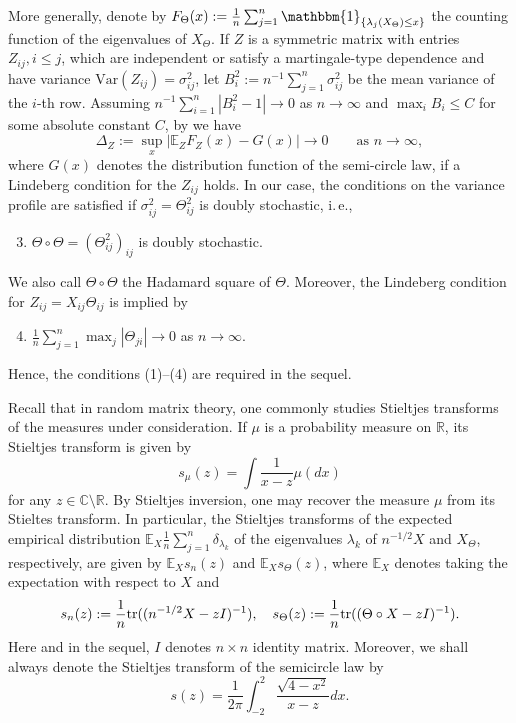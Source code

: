\documentclass[a4paper,12pt]{amsart}
\numberwithin{equation}{section}
\theoremstyle{remark}
\def\E{{\mathbb E}}
\def\C{{\mathbb C}}
\def\R{{\mathbb R}}
\def\tr{{\rm tr}}
\begin{document}
More generally, denote by $F_\Theta (x):= \frac 1 n \sum_{j=1}^n \mathbbm{1}_{\{\lambda_j(X_\Theta) \le x\}}$ the counting function of the eigenvalues of $X_\Theta$. If $Z$ is a symmetric matrix with entries $Z_{ij}, i\le j$, which are independent or satisfy a martingale-type dependence and have variance $\mathrm{Var}(Z_{ij}) = \sigma_{ij}^2$, let $B_i^2 := n^{-1} \sum_{j=1}^n \sigma_{ij}^2$ be the mean variance of the $i$-th row. Assuming $n^{-1} \sum_{i=1}^n |B_i^2-1| \to 0$ as $n \to \infty$ and $\max_i B_i \le C$ for some absolute constant $C$, by \cite[Th.\ 1 \& Cor.\ 1]{GNT15} we have 
\[ \Delta_Z:=\sup_x| \E_ZF_Z(x) - G(x)| \to  0\qquad \text{as } n \to \infty,\]
where $G(x)$ denotes the distribution function of the semi-circle law, if a Lindeberg condition for the $Z_{ij}$ holds. In our case, the conditions on the variance profile are satisfied if $\sigma_{ij}^2 = \Theta_{ij}^2$ is doubly stochastic, i.\,e.,
\begin{enumerate}\setcounter{enumi}{2}
    \item $\Theta \circ \Theta = (\Theta_{ij}^2)_{ij}$ is doubly stochastic.
\end{enumerate}
We also call $\Theta \circ \Theta$ the Hadamard square of $\Theta$. Moreover, the Lindeberg condition for $Z_{ij} = X_{ij} \Theta_{ij}$ is implied by
\begin{enumerate}\setcounter{enumi}{3}
    \item $\frac  1 n \sum_{j=1}^n \max_{j} |\Theta_{ji}| \to 0$ as $n \to \infty$.
\end{enumerate}
Hence, the conditions (1)--(4) are required in the sequel.

Recall that in random matrix theory, one commonly studies Stieltjes transforms of the measures under consideration. If $\mu$ is a probability measure on $\R$, its Stieltjes transform is given by
\[
s_\mu(z) = \int \frac{1}{x-z}\mu(dx)
\]
for any $z \in \C \setminus \R$. By Stieltjes inversion, one may recover the measure $\mu$ from its Stieltes transform. In particular, the Stieltjes transforms of the expected empirical distribution $\E_X \frac 1 n \sum_{j=1}^n \delta_{\lambda_k}$ of the eigenvalues $\lambda_k$ of $n^{-1/2} X$ and $X_\Theta$, respectively, are given by $\E_X s_n(z)$ and $\E_X s_\Theta (z)$, where $\E_X$ denotes taking the expectation with respect to $X$ and
\[
s_n(z):= \frac 1 n \tr ((n^{-1/2} X-z I)^{-1}) , \quad s_\Theta(z):= \frac 1 n \tr( (\Theta \circ X- z I )^{-1}).
\]
Here and in the sequel, $I$ denotes $n \times n$ identity matrix. Moreover, we shall always denote the Stieltjes transform of the semicircle law by
\[
s(z) = \frac{1}{2\pi}\int_{-2}^2 \frac{\sqrt{4-x^2}}{x-z} dx.
\]
\end{document}

